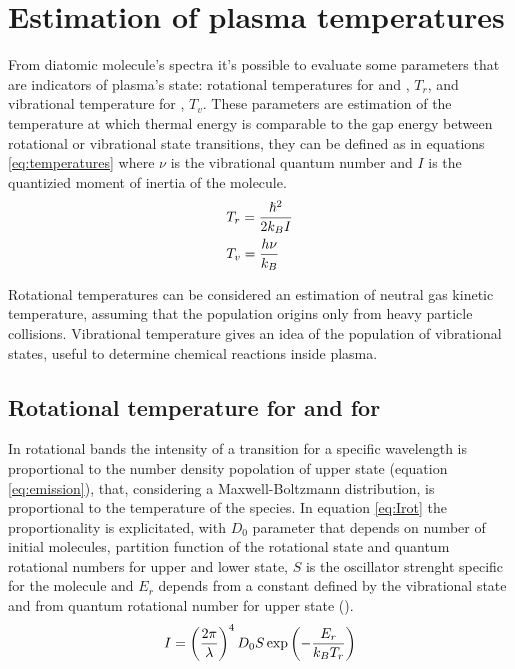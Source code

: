 \section{Estimation of plasma temperatures}
From diatomic molecule's spectra it's possible to evaluate some parameters that are indicators of plasma's state: rotational temperatures for  and , $T_{r}$, and vibrational temperature for , $T_{v}$.
These parameters are estimation of the temperature at which thermal energy is comparable to the gap energy between rotational or vibrational state transitions, they can be defined as in equations \ref{eq:temperatures} where $\nu$ is the vibrational quantum number and $I$ is the quantizied moment of inertia of the molecule.
\begin{equation}
 \centering
 \begin{split}
  &T_{r} = \frac{\hslash^2}{2 k_{B} I}\\
  &T_{v} = \frac{h \nu}{k_{B}}
 \end{split}
 \label{eq:temperatures}
\end{equation}

Rotational temperatures can be considered an estimation of neutral gas kinetic temperature, assuming that the population origins only from heavy particle collisions. Vibrational temperature gives an idea of the population of vibrational states, useful to determine chemical reactions inside plasma.

\subsection{Rotational temperature for  and for }
In rotational bands the intensity of a transition for a specific wavelength is proportional to the number density popolation of upper state (equation \ref{eq:emission}), that, considering a Maxwell-Boltzmann distribution, is proportional to the temperature of the species. In equation \ref{eq:Irot} the proportionality is explicitated, with $D_{0}$ parameter that depends on number of initial molecules, partition function of the rotational state and quantum rotational numbers for upper and lower state, $S$ is the oscillator strenght specific for the molecule and $E_{r}$ depends from a constant defined by the vibrational state and from quantum rotational number for upper state (\cite{MOON2003249}).
\begin{equation}
 \centering
 I = \left(\frac{2 \pi}{\lambda}\right)^4 D_0 S \exp\left(-\frac{E_r}{k_B T_r}\right)
 \label{eq:Irot}
\end{equation}


